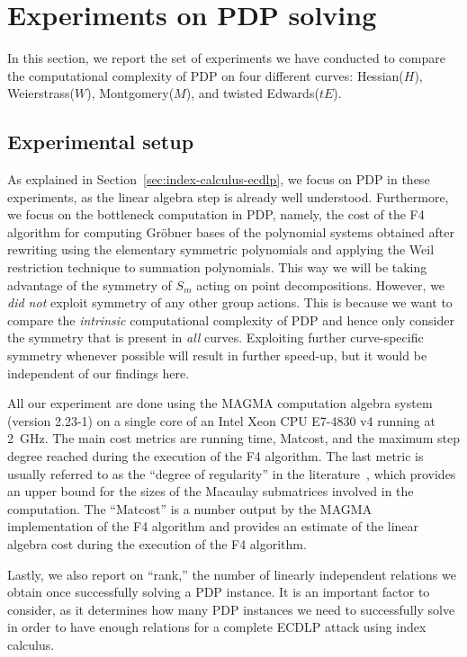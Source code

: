 \section{Experiments on PDP solving}
\label{sec:experiment}

In this section, we report the set of experiments we have conducted to
compare the computational complexity of PDP on four different curves:
Hessian($H$), Weierstrass($W$), Montgomery($M$), and twisted
Edwards($tE$).

\subsection{Experimental setup}
\label{subsec:conditions}



As explained in Section~\ref{sec:index-calculus-ecdlp}, we focus on
PDP in these experiments, as the linear algebra step is already well
understood.
%
Furthermore, we focus on the bottleneck computation in PDP, namely,
the cost of the F4 algorithm for computing Gr\"obner bases of the
polynomial systems obtained after rewriting using the elementary
symmetric polynomials and applying the Weil restriction technique to
summation polynomials.
%
This way we will be taking advantage of the symmetry of $S_m$ acting
on point decompositions.
% 
However, we \emph{did not} exploit symmetry of any other group
actions.
%
This is because we want to compare the \emph{intrinsic} computational
complexity of PDP and hence only consider the symmetry that is present
in \emph{all} curves.
%
Exploiting further curve-specific symmetry whenever possible will
result in further speed-up, but it would be independent of our
findings here.

All our experiment are done using the MAGMA computation algebra system
(version 2.23-1) on a single core of an Intel Xeon CPU E7-4830 v4
running at 2~GHz.
%
The main cost metrics are running time, Matcost, and the maximum step
degree reached during the execution of the F4 algorithm.
%
The last metric is usually referred to as the ``degree of regularity''
in the literature~\cite{DBLP:conf/indocrypt/GalbraithG14}, which
provides an upper bound for the sizes of the Macaulay submatrices
involved in the computation.
%
The ``Matcost'' is a number output by the MAGMA implementation of the
F4 algorithm and provides an estimate of the linear algebra cost
during the execution of the F4 algorithm.

Lastly, we also report on ``rank,'' the number of linearly independent
relations we obtain once successfully solving a PDP instance.
%
It is an important factor to consider, as it determines how many PDP
instances we need to successfully solve in order to have enough
relations for a complete ECDLP attack using index calculus.

